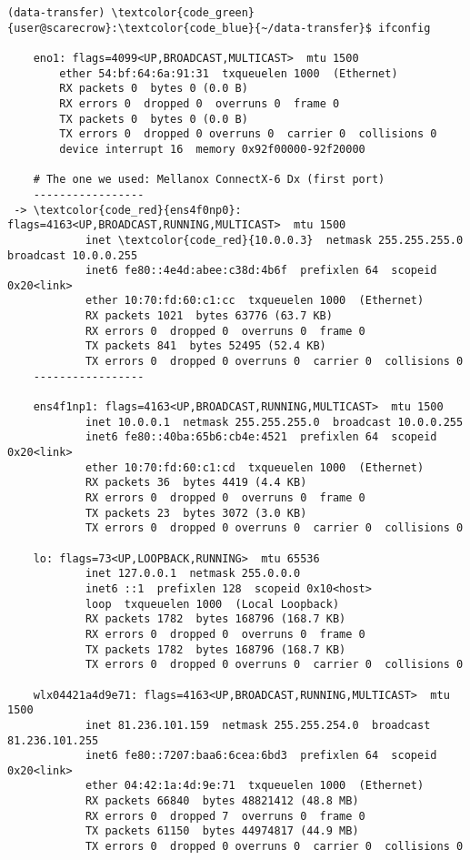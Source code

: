\documentclass[a4paper,onecolumn]{article}
\begin{document}
\begin{Verbatim}[commandchars=\\\{\}]
(data-transfer) \textcolor{code_green}{user@scarecrow}:\textcolor{code_blue}{~/data-transfer}$ ifconfig

    eno1: flags=4099<UP,BROADCAST,MULTICAST>  mtu 1500
        ether 54:bf:64:6a:91:31  txqueuelen 1000  (Ethernet)
        RX packets 0  bytes 0 (0.0 B)
        RX errors 0  dropped 0  overruns 0  frame 0
        TX packets 0  bytes 0 (0.0 B)
        TX errors 0  dropped 0 overruns 0  carrier 0  collisions 0
        device interrupt 16  memory 0x92f00000-92f20000  

    # The one we used: Mellanox ConnectX-6 Dx (first port)
    -----------------
 -> \textcolor{code_red}{ens4f0np0}: flags=4163<UP,BROADCAST,RUNNING,MULTICAST>  mtu 1500
            inet \textcolor{code_red}{10.0.0.3}  netmask 255.255.255.0  broadcast 10.0.0.255
            inet6 fe80::4e4d:abee:c38d:4b6f  prefixlen 64  scopeid 0x20<link>
            ether 10:70:fd:60:c1:cc  txqueuelen 1000  (Ethernet)
            RX packets 1021  bytes 63776 (63.7 KB)
            RX errors 0  dropped 0  overruns 0  frame 0
            TX packets 841  bytes 52495 (52.4 KB)
            TX errors 0  dropped 0 overruns 0  carrier 0  collisions 0
    -----------------

    ens4f1np1: flags=4163<UP,BROADCAST,RUNNING,MULTICAST>  mtu 1500
            inet 10.0.0.1  netmask 255.255.255.0  broadcast 10.0.0.255
            inet6 fe80::40ba:65b6:cb4e:4521  prefixlen 64  scopeid 0x20<link>
            ether 10:70:fd:60:c1:cd  txqueuelen 1000  (Ethernet)
            RX packets 36  bytes 4419 (4.4 KB)
            RX errors 0  dropped 0  overruns 0  frame 0
            TX packets 23  bytes 3072 (3.0 KB)
            TX errors 0  dropped 0 overruns 0  carrier 0  collisions 0

    lo: flags=73<UP,LOOPBACK,RUNNING>  mtu 65536
            inet 127.0.0.1  netmask 255.0.0.0
            inet6 ::1  prefixlen 128  scopeid 0x10<host>
            loop  txqueuelen 1000  (Local Loopback)
            RX packets 1782  bytes 168796 (168.7 KB)
            RX errors 0  dropped 0  overruns 0  frame 0
            TX packets 1782  bytes 168796 (168.7 KB)
            TX errors 0  dropped 0 overruns 0  carrier 0  collisions 0

    wlx04421a4d9e71: flags=4163<UP,BROADCAST,RUNNING,MULTICAST>  mtu 1500
            inet 81.236.101.159  netmask 255.255.254.0  broadcast 81.236.101.255
            inet6 fe80::7207:baa6:6cea:6bd3  prefixlen 64  scopeid 0x20<link>
            ether 04:42:1a:4d:9e:71  txqueuelen 1000  (Ethernet)
            RX packets 66840  bytes 48821412 (48.8 MB)
            RX errors 0  dropped 7  overruns 0  frame 0
            TX packets 61150  bytes 44974817 (44.9 MB)
            TX errors 0  dropped 0 overruns 0  carrier 0  collisions 0
\end{Verbatim}
\end{document}
